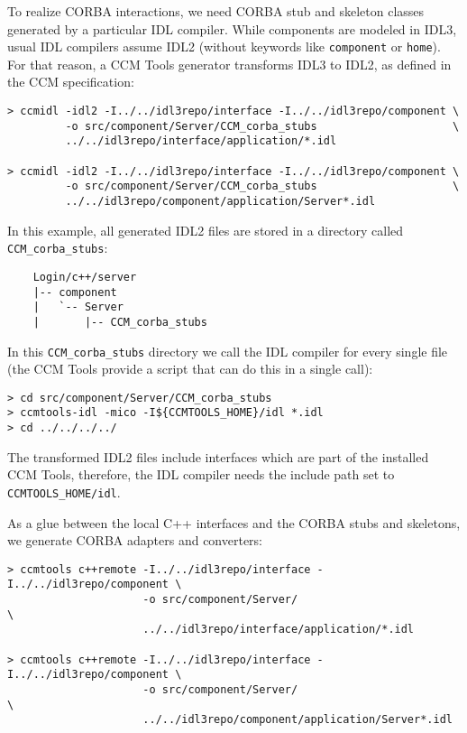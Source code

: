 \vspace{3mm}
To realize CORBA interactions, we need CORBA stub and skeleton classes 
generated by a particular IDL compiler. While components are modeled in
IDL3, usual IDL compilers assume IDL2 (without keywords like {\tt component} or 
{\tt home}).
For that reason, a CCM Tools generator transforms IDL3 to IDL2, as defined in
the CCM specification:
\begin{footnotesize}
\begin{verbatim}
> ccmidl -idl2 -I../../idl3repo/interface -I../../idl3repo/component \
         -o src/component/Server/CCM_corba_stubs                     \  
         ../../idl3repo/interface/application/*.idl

> ccmidl -idl2 -I../../idl3repo/interface -I../../idl3repo/component \
         -o src/component/Server/CCM_corba_stubs                     \
         ../../idl3repo/component/application/Server*.idl
\end{verbatim}
\end{footnotesize}

In this example, all generated IDL2 files are stored in a directory called {\tt
CCM\_corba\_stubs}:
\begin{footnotesize}
\begin{verbatim}
    Login/c++/server
    |-- component
    |   `-- Server
    |       |-- CCM_corba_stubs
\end{verbatim}
\end{footnotesize}

In this {\tt CCM\_corba\_stubs} directory we call the IDL compiler for
every single file (the CCM Tools provide a script that can do this
in a single call):
\begin{footnotesize}
\begin{verbatim}
> cd src/component/Server/CCM_corba_stubs
> ccmtools-idl -mico -I${CCMTOOLS_HOME}/idl *.idl
> cd ../../../../
\end{verbatim}
\end{footnotesize}

The transformed IDL2 files include interfaces which are part of the
installed CCM Tools, therefore, the IDL compiler needs the include path set to
{\tt CCMTOOLS\_HOME/idl}.

\vspace{3mm}
As a glue between the local C++ interfaces and the CORBA stubs and skeletons, we
generate CORBA adapters and converters:
\begin{footnotesize}
\begin{verbatim}
> ccmtools c++remote -I../../idl3repo/interface -I../../idl3repo/component \
                     -o src/component/Server/                              \
                     ../../idl3repo/interface/application/*.idl

> ccmtools c++remote -I../../idl3repo/interface -I../../idl3repo/component \
                     -o src/component/Server/                              \
                     ../../idl3repo/component/application/Server*.idl
\end{verbatim}
\end{footnotesize}

